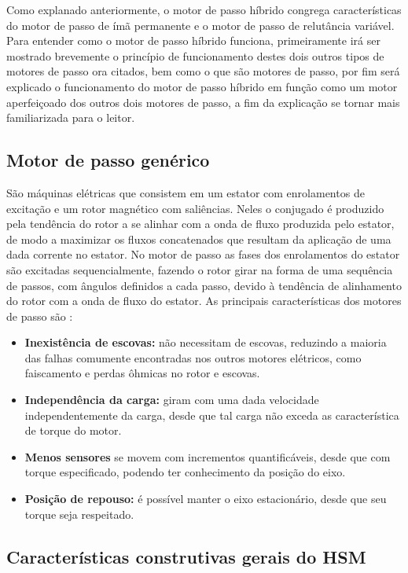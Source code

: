 Como explanado anteriormente, o motor de passo híbrido congrega características do motor de passo de ímã permanente e o motor de passo de relutância variável. Para entender como o motor de passo híbrido funciona, primeiramente irá ser mostrado brevemente o princípio de funcionamento destes dois outros tipos de motores de passo ora citados, bem como o que são motores de passo, por fim será explicado o funcionamento do motor de passo híbrido em função como um motor aperfeiçoado dos outros dois motores de passo, a fim da explicação se tornar mais familiarizada para o leitor.  

	\subsection{Motor de passo genérico}
	São máquinas elétricas que consistem em um estator com enrolamentos de excitação e um rotor magnético com saliências. Neles o conjugado é produzido pela tendência do rotor a se alinhar com a onda de fluxo produzida pelo estator, de modo a maximizar os fluxos concatenados que resultam da aplicação de uma dada corrente no estator. No motor de passo as fases dos enrolamentos do estator são excitadas sequencialmente, fazendo o rotor girar na forma de uma sequência de passos, com ângulos definidos a cada passo, devido à tendência de alinhamento do rotor com a onda de fluxo do estator. \cite{Fitz} As principais características dos motores de passo são \cite{MoonsHSM}:
	
	\begin{itemize}
		\item \textbf{Inexistência de escovas:} não necessitam de escovas, reduzindo a maioria das falhas comumente encontradas nos outros motores elétricos, como faiscamento e perdas ôhmicas no rotor e escovas.
		\item \textbf{Independência da carga:} giram com uma dada velocidade independentemente da carga, desde que tal carga não exceda as característica de torque do motor.
		\item \textbf{Menos sensores} se movem com incrementos quantificáveis, desde que com torque especificado, podendo ter conhecimento da posição do eixo.
		\item \textbf{Posição de repouso:} é possível manter o eixo estacionário, desde que seu torque seja respeitado. 
	\end{itemize}
	
	\subsection{Características construtivas gerais do HSM}
	

